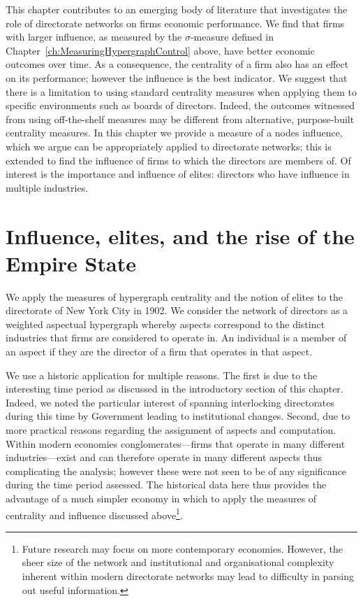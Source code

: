 This chapter contributes to an emerging body of literature that investigates the role of directorate networks on firms economic performance. We find that firms with larger influence, as measured by the $\sigma$-measure defined in Chapter~\ref{ch:MeasuringHypergraphControl} above, have better economic outcomes over time. As a consequence, the centrality of a firm also has an effect on its performance; however the influence is the best indicator. We suggest that there is a limitation to using standard centrality measures when applying them to specific environments such as boards of directors. Indeed, the outcomes witnessed from using off-the-shelf measures may be different from alternative, purpose-built centrality measures. In this chapter we provide a measure of a nodes influence, which we argue can be appropriately applied to directorate networks; this is extended to find the influence of firms to which the directors are members of. Of interest is the importance and influence of elites: directors who have influence in multiple industries.

\section{Influence, elites, and the rise of the Empire State} 
\label{Application:Network}

We apply the measures of hypergraph centrality and the notion of elites to the directorate of New York City in 1902. We consider the network of directors as a weighted aspectual hypergraph whereby aspects correspond to the distinct industries that firms are considered to operate in. An individual is a member of an aspect if they are the director of a firm that operates in that aspect.

We use a historic application for multiple reasons. The first is due to the interesting time period as discussed in the introductory section of this chapter. Indeed, we noted the particular interest of spanning interlocking directorates during this time by Government leading to institutional changes. Second, due to more practical reasons regarding the assignment of aspects and computation. Within modern economies conglomerates---firms that operate in many different industries---exist and can therefore operate in many different aspects thus complicating the analysis; however these were not seen to be of any significance during the time period assessed. The historical data here thus provides the advantage of a much simpler economy in which to apply the measures of centrality and influence discussed above\footnote{Future research may focus on more contemporary economies. However, the sheer size of the network and institutional and organisational complexity inherent within modern directorate networks may lead to difficulty in parsing out useful information.}.

